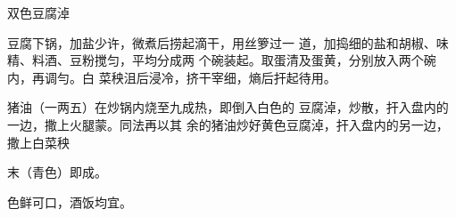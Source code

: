 \begin{recipe}[鸳鸯豆腐淖]{双色豆腐淖}

\ingredients


\cooking

\step 豆腐下锅，加盐少许，微煮后捞起滴干，用丝箩过一 道，加捣细的盐和胡椒、味精、料酒、豆粉搅匀，平均分成两 个碗装起。取蛋清及蛋黄，分别放入两个碗内，再调勻。白 菜秧沮后浸冷，挤干宰细，熵后扞起待用。

\step 猪油（一两五）在炒锅内烧至九成热，即倒入白色的 豆腐淖，炒散，扞入盘内的一边，撒上火腿蒙。同法再以其 余的猪油炒好黄色豆腐淖，扞入盘内的另一边，撒上白菜秧

末（青色）即成。

\notes

色鲜可口，酒饭均宜。

\end{recipe}

